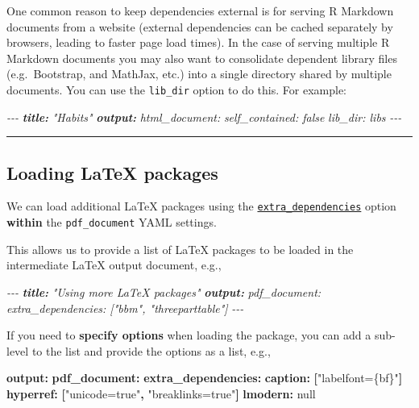 \documentclass[
  a4paper,
  twoside,
  openright]{book}
\newenvironment{Shaded}{\begin{snugshade}}{\end{snugshade}}
\newcommand{\AnnotationTok}[1]{\textcolor[rgb]{0.56,0.35,0.01}{\textbf{\textit{#1}}}}
\newcommand{\AttributeTok}[1]{\textcolor[rgb]{0.13,0.29,0.53}{#1}}
\newcommand{\CharTok}[1]{\textcolor[rgb]{0.31,0.60,0.02}{#1}}
\newcommand{\CommentTok}[1]{\textcolor[rgb]{0.56,0.35,0.01}{\textit{#1}}}
\newcommand{\FunctionTok}[1]{\textcolor[rgb]{0.13,0.29,0.53}{\textbf{#1}}}
\newcommand{\KeywordTok}[1]{\textcolor[rgb]{0.13,0.29,0.53}{\textbf{#1}}}
\newcommand{\StringTok}[1]{\textcolor[rgb]{0.31,0.60,0.02}{#1}}
\theoremstyle{definition}
\theoremstyle{definition}
\theoremstyle{definition}
\theoremstyle{definition}
\theoremstyle{remark}
\begin{document}
One common reason to keep dependencies external is for serving R Markdown documents from a website (external dependencies can be cached separately by browsers, leading to faster page load times). In the case of serving multiple R Markdown documents you may also want to consolidate dependent library files (e.g.~Bootstrap, and MathJax, etc.) into a single directory shared by multiple documents. You can use the \texttt{lib\_dir} option to do this. For example:

\begin{Shaded}
\begin{Highlighting}[]
\CommentTok{{-}{-}{-}}
\AnnotationTok{title:}\CommentTok{ "Habits"}
\AnnotationTok{output:}
\CommentTok{  html\_document:}
\CommentTok{    self\_contained: false}
\CommentTok{    lib\_dir: libs}
\CommentTok{{-}{-}{-}}
\end{Highlighting}
\end{Shaded}

\begin{center}\rule{0.5\linewidth}{0.5pt}\end{center}

\subsection*{Loading LaTeX packages}\label{loading-latex-packages}

We can load additional LaTeX packages using the \href{https://bookdown.org/yihui/rmarkdown-cookbook/latex-extra.html}{\texttt{extra\_dependencies}} option {\textbf{within} the \texttt{pdf\_document}} YAML settings.

This allows us to provide a list of LaTeX packages to be loaded in the intermediate LaTeX output document, e.g.,

\begin{Shaded}
\begin{Highlighting}[]
\CommentTok{{-}{-}{-}}
\AnnotationTok{title:}\CommentTok{ "Using more LaTeX packages"}
\AnnotationTok{output:}\CommentTok{ }
\CommentTok{  pdf\_document:}
\CommentTok{    extra\_dependencies: ["bbm", "threeparttable"]}
\CommentTok{{-}{-}{-}}
\end{Highlighting}
\end{Shaded}

If you need to \textbf{specify options} when loading the package, you can add a sub-level to the list and provide the options as a list, e.g.,

\begin{Shaded}
\begin{Highlighting}[]
\FunctionTok{output}\KeywordTok{:}\AttributeTok{ }
\AttributeTok{  }\FunctionTok{pdf\_document}\KeywordTok{:}
\AttributeTok{    }\FunctionTok{extra\_dependencies}\KeywordTok{:}
\AttributeTok{      }\FunctionTok{caption}\KeywordTok{:}\AttributeTok{ }\KeywordTok{[}\StringTok{"labelfont=\{bf\}"}\KeywordTok{]}
\AttributeTok{      }\FunctionTok{hyperref}\KeywordTok{:}\AttributeTok{ }\KeywordTok{[}\StringTok{"unicode=true"}\KeywordTok{,}\AttributeTok{ }\StringTok{"breaklinks=true"}\KeywordTok{]}
\AttributeTok{      }\FunctionTok{lmodern}\KeywordTok{:}\AttributeTok{ }\CharTok{null}
\end{Highlighting}
\end{Shaded}
\end{document}
